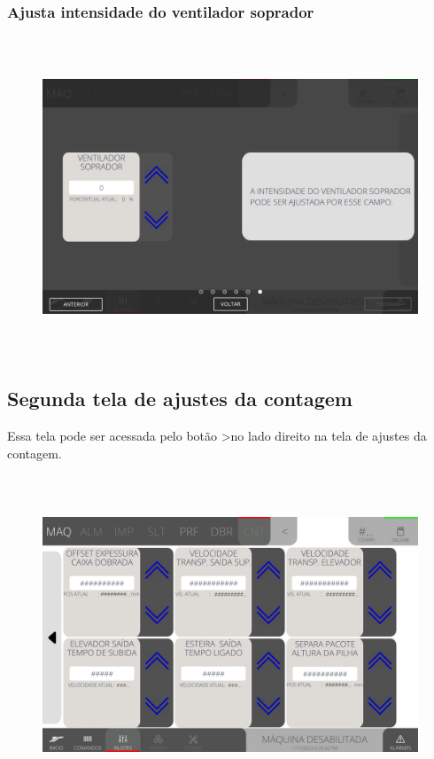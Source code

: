 \newpage
\thispagestyle{fancy}
\vspace*{40 pt}
\subsubsection{\small{Ajusta intensidade do ventilador soprador}}
\vspace*{\fill}
\begin{figure}[h]
  \centering
  \includegraphics[width=576px,height=360px]{src/imagesFlexo/08-count/settings/e-6.png}
\end{figure}
\vspace*{\fill}

\newpage
\thispagestyle{fancy}
\vspace*{40 pt}
\subsection{Segunda tela de ajustes da contagem}
Essa tela pode ser acessada pelo botão \textgreater no lado direito na tela de ajustes da contagem.
\vspace*{\fill}
\begin{figure}[h]
  \centering
  \includegraphics[width=576px,height=360px]{src/imagesFlexo/08-count/settings/e-Tela-Principal-2.png}
\end{figure}
\vspace*{\fill}

